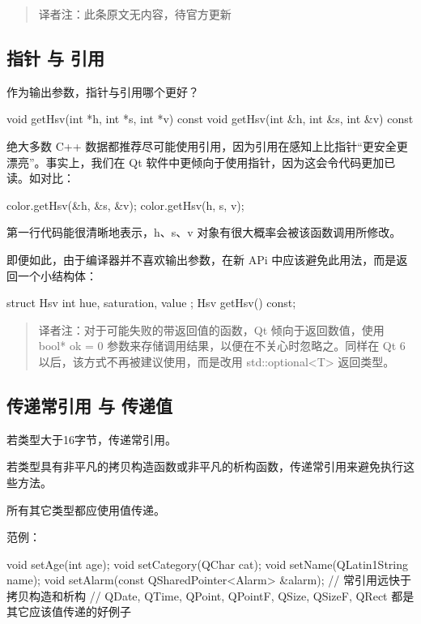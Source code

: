 \begin{quote}
译者注：此条原文无内容，待官方更新
\end{quote}

\subsection{指针 与 引用}

作为输出参数，指针与引用哪个更好？

\begin{cppcode}
void getHsv(int *h, int *s, int *v) const void getHsv(int &h, int &s, int &v) const
\end{cppcode}

绝大多数 C++ 数据都推荐尽可能使用引用，因为引用在感知上比指针“更安全更漂亮”。事实上，我们在 Qt 软件中更倾向于使用指针，因为这会令代码更加已读。如对比：


\begin{cppcode}
color.getHsv(&h, &s, &v);
color.getHsv(h, s, v);
\end{cppcode}

第一行代码能很清晰地表示，h、s、v 对象有很大概率会被该函数调用所修改。

即便如此，由于编译器并不喜欢输出参数，在新 APi 中应该避免此用法，而是返回一个小结构体：

\begin{cppcode}
struct Hsv { int hue, saturation, value }; Hsv getHsv() const;
\end{cppcode}

\begin{quote}
	译者注：对于可能失败的带返回值的函数，Qt 倾向于返回数值，使用 bool* ok = 0 参数来存储调用结果，以便在不关心时忽略之。同样在 Qt 6 以后，该方式不再被建议使用，而是改用 std::optional<T> 返回类型。
\end{quote}

\subsection{传递常引用 与 传递值}
若类型大于16字节，传递常引用。

若类型具有非平凡的拷贝构造函数或非平凡的析构函数，传递常引用来避免执行这些方法。

所有其它类型都应使用值传递。

范例：

\begin{cppcode}
void setAge(int age);
void setCategory(QChar cat);
void setName(QLatin1String name);
void setAlarm(const QSharedPointer<Alarm> &alarm); // 常引用远快于拷贝构造和析构
// QDate, QTime, QPoint, QPointF, QSize, QSizeF, QRect 都是其它应该值传递的好例子
\end{cppcode}

